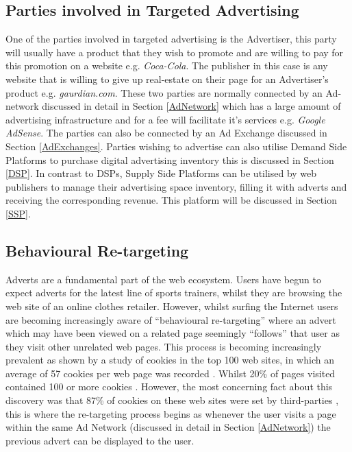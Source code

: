\documentclass{article}
\begin{document}
\subsection{Parties involved in Targeted Advertising}
One of the parties involved in targeted advertising is the Advertiser, this party will usually have a product that they wish to promote and are willing to pay for this promotion on a website e.g. \textit{Coca-Cola}. The publisher in this case is any website that is willing to give up real-estate on their page for an Advertiser's product e.g. \textit{gaurdian.com}. These two parties are normally connected by an Ad-network discussed in detail in Section \ref{AdNetwork} which has a large amount of advertising infrastructure and for a fee will facilitate it's services e.g. \textit{Google AdSense}. The parties can also be connected by an Ad Exchange discussed in Section \ref{AdExchanges}. Parties wishing to advertise can also utilise Demand Side Platforms to purchase digital advertising inventory this is discussed in Section \ref{DSP}. In contrast to DSPs, Supply Side Platforms can be utilised by web publishers to manage their advertising space inventory, filling it with adverts and receiving the corresponding revenue. This platform will be discussed in Section \ref{SSP}.  

\subsection{Behavioural Re-targeting}
Adverts are a fundamental part of the web ecosystem. Users have begun to expect adverts for the latest line of sports trainers, whilst they are browsing the web site of an online clothes retailer. However, whilst surfing the Internet users are becoming increasingly aware of ``behavioural re-targeting'' where an advert which may have been viewed on a related page seemingly ``follows'' that user as they visit other unrelated web pages. This process is becoming increasingly prevalent as shown by a study of cookies in the top 100 web sites, in which an average of 57 cookies per web page was recorded \parencite{taOffer}. Whilst 20\% of pages visited contained 100 or more cookies \parencite{taOffer}. However, the most concerning fact about this discovery was that 87\% of cookies on these web sites were set by third-parties \parencite{taOffer}, this is where the re-targeting process begins as whenever the user visits a page within the same Ad Network (discussed in detail in Section \ref{AdNetwork}) the previous advert can be displayed to the user. \newline
\end{document}
